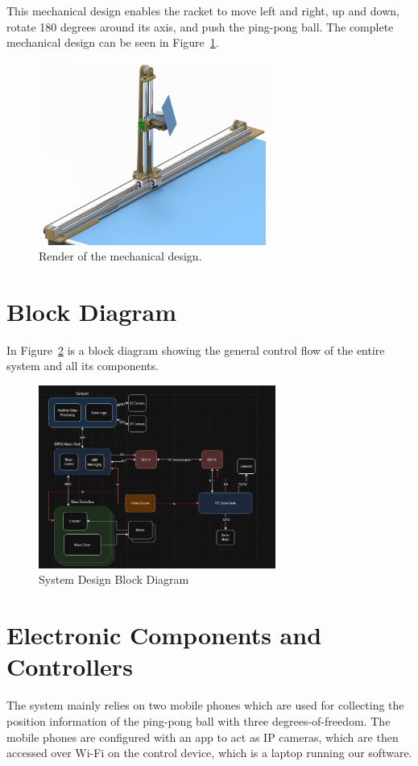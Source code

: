 This mechanical design enables the racket to move left and right, up and down, rotate 180 degrees around its axis, and push the ping-pong ball. The complete mechanical design can be seen in Figure~\ref{fig:mechanical-design}.

\begin{figure}[h] 
	\centering \includegraphics[height=6cm]{./images/render.jpg}
	\caption{Render of the mechanical design.}
	\label{fig:mechanical-design}
\end{figure}

\section{Block Diagram}
In Figure~\ref{fig:block-diagram} is a block diagram showing the general control flow of the entire system and all its components.

\begin{figure}[h]
	\centering\includegraphics[height=6cm]{./images/blockdiagram}
	\caption{System Design Block Diagram}
	\label{fig:block-diagram}
\end{figure}

\section{Electronic Components and Controllers}
The system mainly relies on two mobile phones which are used for collecting the position information of the ping-pong ball with three degrees-of-freedom. The mobile phones are configured with an app to act as IP cameras, which are then accessed over Wi-Fi on the control device, which is a laptop running our software.

